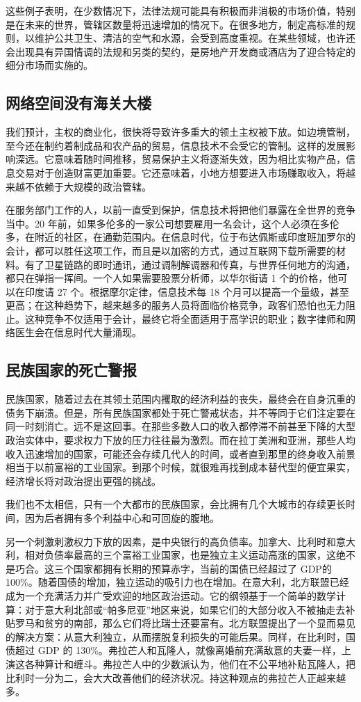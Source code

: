 这些例子表明，在少数情况下，法律法规可能具有积极而非消极的市场价值，特别是在未来的世界，管辖区数量将迅速增加的情况下。在很多地方，制定高标准的规则，以维护公共卫生、清洁的空气和水源，会受到高度重视。在某些领域，也许还会出现具有异国情调的法规和另类的契约，是房地产开发商或酒店为了迎合特定的细分市场而实施的。

\subsection{网络空间没有海关大楼}
我们预计，主权的商业化，很快将导致许多重大的领土主权被下放。如边境管制，至今还在制约着制成品和农产品的贸易，信息技术不会受它的管制。这样的发展影响深远。它意味着随时间推移，贸易保护主义将逐渐失效，因为相比实物产品，信息交易对于创造财富更加重要。它还意味着，小地方想要进入市场赚取收入，将越来越不依赖于大规模的政治管辖。

在服务部门工作的人，以前一直受到保护，信息技术将把他们暴露在全世界的竞争当中。20 年前，如果多伦多的一家公司想要雇用一名会计，这个人必须在多伦多，在附近的社区，在通勤范围内。在信息时代，位于布达佩斯或印度班加罗尔的会计，都可以胜任这项工作，而且是以加密的方式，通过互联网下载所需要的材料。有了卫星链路的即时通讯，通过调制解调器和传真，与世界任何地方的沟通，都只在弹指一挥间。一个人如果需要股票分析师，以华尔街请 1 个的价格，他可以在印度请 27 个。根据摩尔定律，信息技术每 18 个月可以提高一个量级，甚至更高；在这种趋势下，越来越多的服务人员将面临价格竞争，政客们恐怕也无力阻止。这种竞争不仅适用于会计，最终它将全面适用于高学识的职业；数字律师和网络医生会在信息时代大量涌现。

\subsection{民族国家的死亡警报}
民族国家，随着过去在其领土范围内攫取的经济利益的丧失，最终会在自身沉重的债务下崩溃。但是，所有民族国家都处于死亡警戒状态，并不等同于它们注定要在同一时刻消亡。远不是这回事。在那些多数人口的收入都停滞不前甚至下降的大型政治实体中，要求权力下放的压力往往最为激烈。而在拉丁美洲和亚洲，那些人均收入迅速增加的国家，可能还会存续几代人的时间，或者直到那里的终身收入前景相当于以前富裕的工业国家。到那个时候，就很难再找到成本替代型的便宜果实，经济增长将对政治提出更强的挑战。

我们也不太相信，只有一个大都市的民族国家，会比拥有几个大城市的存续更长时间，因为后者拥有多个利益中心和可回旋的腹地。

另一个刺激刺激权力下放的因素，是中央银行的高负债率。加拿大、比利时和意大利，相对负债率最高的三个富裕工业国家，也是独立主义运动高涨的国家，这绝不是巧合。这三个国家都拥有长期的预算赤字，当前的国债已经超过了 GDP的 100\%。随着国债的增加，独立运动的吸引力也在增加。在意大利，北方联盟已经成为一个充满活力并广受欢迎的地区政治运动。它的纲领基于一个简单的数学计算：对于意大利北部或“帕多尼亚”地区来说，如果它们的大部分收入不被抽走去补贴罗马和贫穷的南部，那么它们将比瑞士还要富有。北方联盟提出了一个显而易见的解决方案：从意大利独立，从而摆脱复利损失的可能后果。同样，在比利时，国债超过 GDP 的 130\%。弗拉芒人和瓦隆人，就像离婚前充满敌意的夫妻一样，上演这各种算计和缠斗。弗拉芒人中的少数派认为，他们在不公平地补贴瓦隆人，把比利时一分为二，会大大改善他们的经济状况。持这种观点的弗拉芒人正越来越多。

